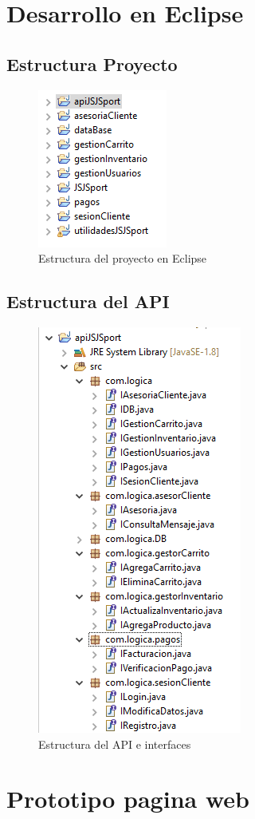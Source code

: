 
\newpage

\section{Desarrollo en Eclipse}

\subsection{Estructura Proyecto}
\begin{figure}[th!]
	\centering
	\includegraphics[width=0.3\linewidth]{conclusiones/imagenes/Proyecto}
	\caption{Estructura del proyecto en Eclipse}
\end{figure}

\subsection{Estructura del API}
\begin{figure}[th!]
	\centering
	\includegraphics[width=0.3\linewidth]{conclusiones/imagenes/EstructuraAPI}
	\caption{Estructura del API e interfaces}
\end{figure}
\newpage

\section{Prototipo pagina web}

